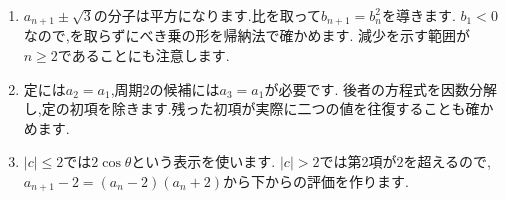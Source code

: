 \begin{enumerate}[label=\textbf{問\arabic*.},leftmargin=3.8em,format=\bookitemlink{practice-special}{hint}{answer}]
    候補の角度が$\frac{\pi}{2}$に$\pi$の整数倍を加えた値になるかを,
    整数の偶奇で判断します.次の角度でも正接が定義できれば,の分母も$0$になりません.
  \item $a_{n+1}\pm\sqrt3$の分子は平方になります.比を取って$b_{n+1}=b_n^2$を導きます.
    $b_1<0$なので,を取らずにべき乗の形を帰納法で確かめます.
    減少を示す範囲が$n\ge2$であることにも注意します.
  \item 定には$a_2=a_1$,周期2の候補には$a_3=a_1$が必要です.
    後者の方程式を因数分解し,定の初項を除きます.残った初項が実際に二つの値を往復することも確かめます.
  \item $|c|\le2$では$2\cos\theta$という表示を使います.
    $|c|>2$では第2項が$2$を超えるので,
    $a_{n+1}-2=(a_n-2)(a_n+2)$から下からの評価を作ります.
\end{enumerate}


